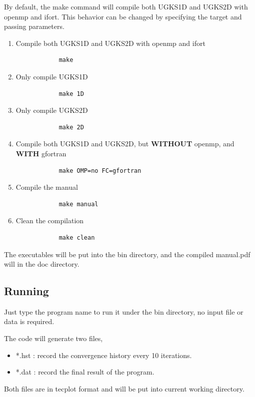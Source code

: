 \documentclass[a4paper]{book}
\begin{document}
By default, the make command will compile both UGKS1D and UGKS2D with openmp and ifort. This behavior can be changed by specifying the target and passing parameters.

\begin{enumerate}
    \item Compile both UGKS1D and UGKS2D with openmp and ifort  
        \begin{verbatim}
            make
        \end{verbatim}
    \item Only compile UGKS1D
        \begin{verbatim}
            make 1D
        \end{verbatim}
    \item Only compile UGKS2D
        \begin{verbatim}
            make 2D
        \end{verbatim}
    \item Compile both UGKS1D and UGKS2D, but \textbf{WITHOUT} openmp, and \textbf{WITH} gfortran
        \begin{verbatim}
            make OMP=no FC=gfortran
        \end{verbatim}
    \item Compile the manual
        \begin{verbatim}
            make manual
        \end{verbatim}
    \item Clean the compilation
        \begin{verbatim}
            make clean
        \end{verbatim}
\end{enumerate}

The executables will be put into the bin directory, and the compiled manual.pdf will in the doc directory.

\subsection{Running}
Just type the program name to run it under the bin directory, no input file or data is required. 

The code will generate two files,
\begin{itemize}
    \item *.hst : record the convergence history every 10 iterations.
    \item *.dat : record the final result of the program.
\end{itemize}
Both files are in tecplot format and will be put into current working directory.
\end{document}
